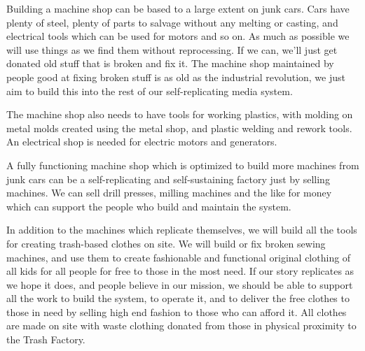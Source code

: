 Building a machine shop can be based to a large extent on junk cars.
Cars have plenty of steel, plenty of parts to salvage without any
melting or casting, and electrical tools which can be used for motors
and so on. As much as possible we will use things as we find them
without reprocessing. If we can, we'll just get donated old stuff that
is broken and fix it. The machine shop maintained by people good at
fixing broken stuff is as old as the industrial revolution, we just aim
to build this into the rest of our self-replicating media system.

The machine shop also needs to have tools for working plastics, with
molding on metal molds created using the metal shop, and plastic welding
and rework tools. An electrical shop is needed for electric motors and
generators.

A fully functioning machine shop which is optimized to build more
machines from junk cars can be a self-replicating and self-sustaining
factory just by selling machines. We can sell drill presses, milling
machines and the like for money which can support the people who build
and maintain the system.

In addition to the machines which replicate themselves, we will build
all the tools for creating trash-based clothes on site. We will build or
fix broken sewing machines, and use them to create fashionable and
functional original clothing of all kids for all people for free to
those in the most need. If our story replicates as we hope it does, and
people believe in our mission, we should be able to support all the work
to build the system, to operate it, and to deliver the free clothes to
those in need by selling high end fashion to those who can afford it.
All clothes are made on site with waste clothing donated from those in
physical proximity to the Trash Factory.

